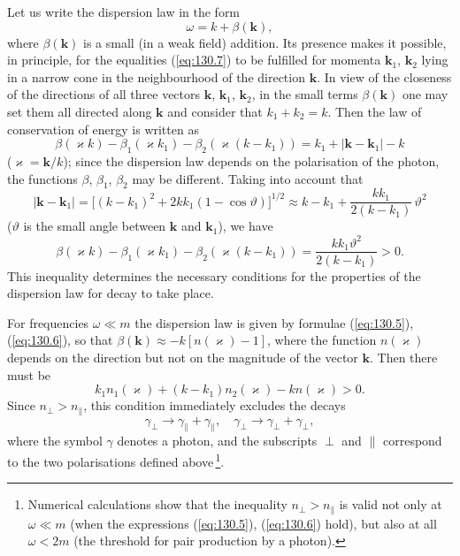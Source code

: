 Let us write the dispersion law in the form
\begin{equation}
\omega = k + \beta(\mathbf{k}),
\label{eq:130.8}
\end{equation}
where $\beta(\mathbf{k})$ is a small (in a weak field) addition. Its presence makes it possible, in principle, for the equalities (\ref{eq:130.7}) to be fulfilled for momenta $\mathbf{k}_1$, $\mathbf{k}_2$ lying in a narrow cone in the neighbourhood of the direction $\mathbf{k}$. In view of the closeness of the directions of all three vectors $\mathbf{k}$, $\mathbf{k}_1$, $\mathbf{k}_2$, in the small terms $\beta(\mathbf{k})$ one may set them all directed along $\mathbf{k}$ and consider that $k_1 + k_2 = k$. Then the law of conservation of energy is written as
\[
\beta(\varkappa k) - \beta_1(\varkappa k_1) - \beta_2(\varkappa(k - k_1)) = k_1 + |\mathbf{k} - \mathbf{k}_1| - k
\]
($\varkappa = \mathbf{k}/k$); since the dispersion law depends on the polarisation of the photon, the functions $\beta$, $\beta_1$, $\beta_2$ may be different. Taking into account that
\[
|\mathbf{k} - \mathbf{k}_1| = \bigl[(k - k_1)^2 + 2kk_1(1 - \cos\vartheta)\bigr]^{1/2} \approx k - k_1 + \frac{kk_1}{2(k - k_1)}\,\vartheta^2
\]
($\vartheta$ is the small angle between $\mathbf{k}$ and $\mathbf{k}_1$), we have
\begin{equation}
\beta(\varkappa k) - \beta_1(\varkappa k_1) - \beta_2(\varkappa(k - k_1)) = \frac{kk_1\vartheta^2}{2(k - k_1)} > 0.
\label{eq:130.9}
\end{equation}
This inequality determines the necessary conditions for the properties of the dispersion law for decay to take place.

For frequencies $\omega \ll m$ the dispersion law is given by formulae (\ref{eq:130.5}), (\ref{eq:130.6}), so that $\beta(\mathbf{k}) \approx -k[n(\varkappa) - 1]$, where the function $n(\varkappa)$ depends on the direction but not on the magnitude of the vector $\mathbf{k}$. Then there must be
\begin{equation}
k_1 n_1(\varkappa) + (k - k_1)n_2(\varkappa) - kn(\varkappa) > 0.
\label{eq:130.10}
\end{equation}
Since $n_\perp > n_\parallel$, this condition immediately excludes the decays
\[
\gamma_\perp \to \gamma_\parallel + \gamma_\parallel,\quad \gamma_\perp \to \gamma_\perp + \gamma_\perp,
\]
where the symbol $\gamma$ denotes a photon, and the subscripts $\perp$ and $\parallel$ correspond to the two polarisations defined above\,\footnote{Numerical calculations show that the inequality $n_\perp > n_\parallel$ is valid not only at $\omega \ll m$ (when the expressions (\ref{eq:130.5}), (\ref{eq:130.6}) hold), but also at all $\omega < 2m$ (the threshold for pair production by a photon).}.

